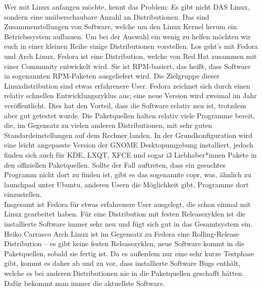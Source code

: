 {Wer mit Linux anfangen möchte, kennt das Problem: Es gibt nicht DAS Linux,
    sondern eine unüberschaubare Anzahl an Distributionen. Das sind
    Zusammenstellungen von Software, welche um den Linux Kernel herum ein
    Betriebssystem aufbauen. Um bei der Auswahl ein wenig zu helfen möchten wir
    euch in einer kleinen Reihe einige Distributionen vorstellen. Los geht's mit Fedora und Arch Linux. }
{
    {Fedora ist eine Distribution, welche von Red Hat zusammen mit einer Community
        entwickelt wird. Sie ist RPM-basiert, das heißt, dass Software in sogenannten
        RPM-Paketen ausgeliefert wird. Die Zielgruppe dieser Linuxdistribution sind
        etwas erfahrenere User. Fedora zeichnet sich durch einen relativ schnellen
        Entwicklungszyklus aus; eine neue Version wird zweimal im Jahr veröffentlicht.
        Dies hat den Vorteil, dass die Software relativ neu ist, trotzdem aber gut
        getestet wurde. Die Paketquellen halten relativ viele Programme bereit, die, im
        Gegensatz zu vielen anderen Distributionen, mit sehr guten
        Standardeinstellungen auf dem Rechner landen. In der Grundkonfiguration wird
        eine leicht angepasste Version der GNOME Desktopumgebung installiert, jedoch
        finden sich auch für KDE, LXQT, XFCE und sogar i3 Liebhaber*innen Pakete in den
        offiziellen Paketquellen. Sollte der Fall auftreten, dass ein gesuchtes
        Programm nicht dort zu finden ist, gibt es das sogenannte copr, was, ähnlich zu
        launchpad unter Ubuntu, anderen Usern die Möglichkeit gibt, Programme dort
        einzustellen.
        \\
        Insgesamt ist Fedora für etwas erfahrenere User ausgelegt, die schon einmal mit
        Linux gearbeitet haben. Für eine Distribution mit festen Releasezyklen ist die
        installierte Software immer sehr neu und fügt sich gut in das Gesamtsystem
        ein.}
    {Heiko Carrasco}
    \vspace{3em}
    {Arch Linux ist im Gegensatz zu Fedora eine Rolling-Release Distribution -- es
        gibt keine festen Releasezyklen, neue Software kommt in die Paketquellen, sobald
        sie fertig ist. Da es außerdem nur eine sehr kurze Testphase gibt, kommt es
        daher ab und zu vor, dass installierte Software Bugs enthält, welche es bei
        anderen Distributionen nie in die Paketquellen geschafft hätten. Dafür bekommt
        man immer die aktuellste Software.\\
}}
